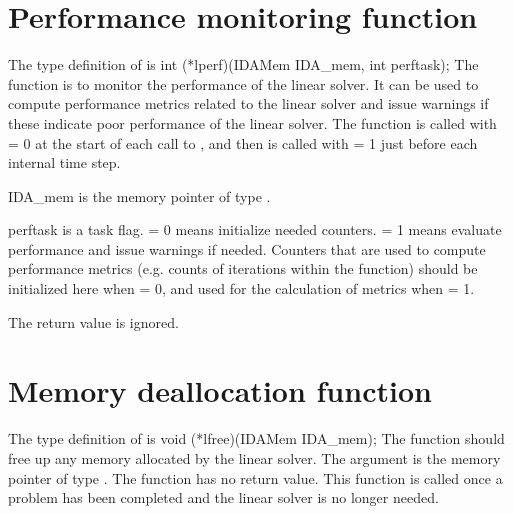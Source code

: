 
\section{Performance monitoring function}
The type definition of  is
{
  int (*lperf)(IDAMem IDA\_mem, int perftask);
}
{
  The  function is to monitor the performance of the linear solver.
  It can be used to compute performance metrics related to the linear solver
  and issue warnings if these indicate poor performance of the linear solver.
  The  function is called with  = 0 at the start of
  each call to , and then is called with  = 1 just
  before each internal time step.
}
{
  \begin{args}
  \item[IDA\_mem]
    is the {\ida} memory pointer of type .
  \item[perftask]
    is a task flag.   = 0 means initialize needed counters.
     = 1 means evaluate performance and issue warnings if needed.
    Counters that are used to compute performance metrics (e.g. counts of
    iterations within the  function) should be initialized here when
     = 0, and used for the calculation of metrics when
     = 1.
  \end{args}
}
{
  The  return value is ignored.
}
{}


\section{Memory deallocation function}
The type definition of  is
{
  void (*lfree)(IDAMem IDA\_mem);
}
{
  The  function should free up any memory allocated by the linear
  solver.
}
{
  The argument  is the {\ida} memory pointer of type .
}
{
  The  function has no return value.
}
{
  This function is called once a problem has been completed and the 
  linear solver is no longer needed.
}
